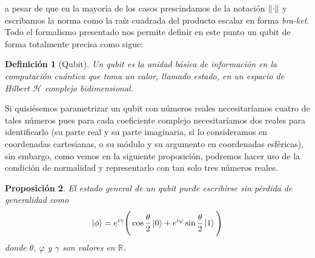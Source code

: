 \documentclass[11pt, spanish]{report}
\numberwithin{equation}{section}
\newtheorem{defin}{Definición}[section]
\newtheorem{prop}[defin]{Proposición}
\numberwithin{defin}{section}
\newenvironment{purpleBox}{\begin{tcolorbox}[colback=purple!3!white,colframe=purple!75!black]}{\end{tcolorbox}}
\begin{document}
\noindent a pesar de que en la mayoría de los casos prescindamos de la notación $\norm{\cdot}$ y escribamos la norma como la raíz cuadrada del producto escalar en forma \textit{bra-ket}.\\

Todo el formalismo presentado nos permite definir en este punto un qubit de forma totalmente precisa como sigue:

\begin{purpleBox}
\begin{defin}[Qubit] Un \emph{qubit}\footnotemark{} es la unidad básica de información en la computación cuántica que toma un valor, llamado \emph{estado}, en un espacio de Hilbert $\mathcal{H}$ complejo bidimensional.
\end{defin}
\end{purpleBox}


Si quisiésemos parametrizar un qubit con números reales necesitaríamos cuatro de tales números pues para cada coeficiente complejo necesitaríamos dos reales para identificarlo (su parte real y su parte imaginaria, si lo consideramos en coordenadas cartesianas, o su módulo y su argumento en coordenadas esféricas), sin embargo, como vemos en la siguiente proposición, podremos hacer uso de la condición de normalidad y representarlo con tan solo tres números reales.\\

\begin{purpleBox}
\begin{prop} El estado general de un qubit puede escribirse sin pérdida de generalidad como
\begin{equation}\label{eqQubitGen}
\ket{\phi}=e^{i\gamma}\Bigg(\cos\frac{\theta}{2}\ket{0}+e^{i\varphi}\sin\frac{\theta}{2}\ket{1} \Bigg)
\end{equation}
donde  $\theta,\ \varphi$ y $\gamma$ son valores en $\mathbb{R}$.
\end{prop}
\end{purpleBox}
\end{document}
